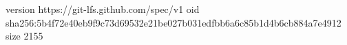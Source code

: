 version https://git-lfs.github.com/spec/v1
oid sha256:5b4f72e40eb9f9c73d69532e21be027b031edfbb6a6c85b1d4b6cb884a7e4912
size 2155
